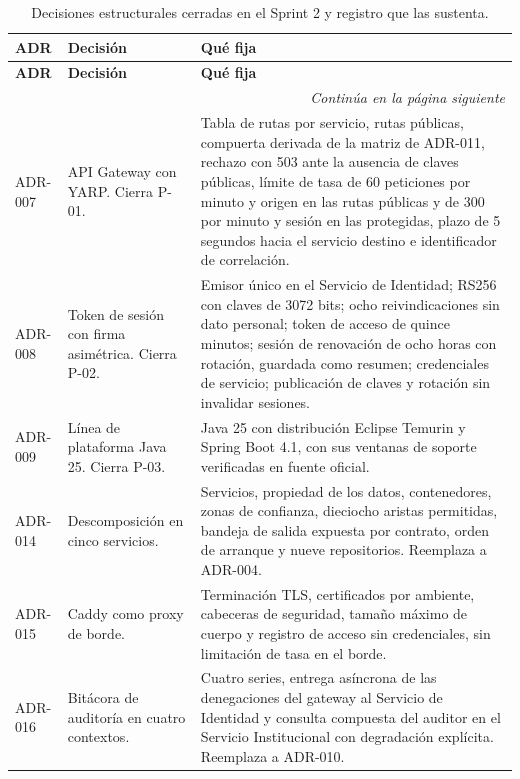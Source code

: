 \documentclass[11pt,a4paper]{article}
\newcommand{\contlinea}[1]{\multicolumn{#1}{r}{\footnotesize\itshape Continúa en la página siguiente}}
\begin{document}
\begin{longtable}{L{1.4cm} L{5.4cm} L{7.4cm}}
\caption{Decisiones estructurales cerradas en el Sprint 2 y registro que las sustenta.}\label{tab:pendientes}\\
\toprule
\textbf{ADR} & \textbf{Decisión} & \textbf{Qué fija} \\
\midrule
\endfirsthead
\toprule
\textbf{ADR} & \textbf{Decisión} & \textbf{Qué fija} \\
\midrule
\endhead
\midrule
\contlinea{3} \\
\endfoot
\bottomrule
\endlastfoot
ADR-007 & API Gateway con YARP. Cierra P-01. & Tabla de rutas por servicio, rutas públicas, compuerta derivada de la matriz de ADR-011, rechazo con 503 ante la ausencia de claves públicas, límite de tasa de 60 peticiones por minuto y origen en las rutas públicas y de 300 por minuto y sesión en las protegidas, plazo de 5 segundos hacia el servicio destino e identificador de correlación. \\
ADR-008 & Token de sesión con firma asimétrica. Cierra P-02. & Emisor único en el Servicio de Identidad; RS256 con claves de 3072 bits; ocho reivindicaciones sin dato personal; token de acceso de quince minutos; sesión de renovación de ocho horas con rotación, guardada como resumen; credenciales de servicio; publicación de claves y rotación sin invalidar sesiones. \\
ADR-009 & Línea de plataforma Java 25. Cierra P-03. & Java 25 con distribución Eclipse Temurin y Spring Boot 4.1, con sus ventanas de soporte verificadas en fuente oficial. \\
ADR-014 & Descomposición en cinco servicios. & Servicios, propiedad de los datos, contenedores, zonas de confianza, dieciocho aristas permitidas, bandeja de salida expuesta por contrato, orden de arranque y nueve repositorios. Reemplaza a ADR-004. \\
ADR-015 & Caddy como proxy de borde. & Terminación TLS, certificados por ambiente, cabeceras de seguridad, tamaño máximo de cuerpo y registro de acceso sin credenciales, sin limitación de tasa en el borde. \\
ADR-016 & Bitácora de auditoría en cuatro contextos. & Cuatro series, entrega asíncrona de las denegaciones del gateway al Servicio de Identidad y consulta compuesta del auditor en el Servicio Institucional con degradación explícita. Reemplaza a ADR-010. \\
\end{longtable}

\end{document}
